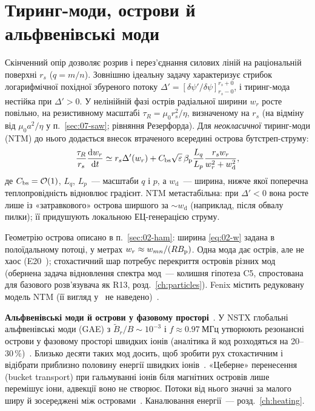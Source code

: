 \section{Тиринг-моди, острови й альфвенівські моди}\label{sec:07-tearing}

\begin{outofcorpus}
Скінченний опір дозволяє розрив і перез'єднання силових ліній на раціональній поверхні $r_s$ ($q=m/n$). Зовнішню ідеальну задачу характеризує стрибок логарифмічної похідної збуреного потоку $\Delta'=[\delta\psi'/\delta\psi]_{r_s-0}^{r_s+0}$, і тиринг-мода нестійка при $\Delta'>0$. У нелінійній фазі острів радіальної ширини $w_r$ росте повільно, на резистивному масштабі $\tau_R=\mu_0r_s^2/\eta$, визначеному на $r_s$ (на відміну від $\mu_0a^2/\eta$ у п.~\ref{sec:07-saw}; рівняння Резерфорда). Для \emph{неокласичної} тиринг-моди (NTM) до нього додається внесок втраченого всередині острова бутстреп-струму:
\begin{equation}\label{eq:07-MRE}
\frac{\tau_R}{r_s}\frac{\mathrm{d} w_r}{\mathrm{d} t}\simeq r_s\Delta'(w_r)+C_{\mathrm{bs}}\sqrt\varepsilon\,\beta_{\mathrm{p}}\frac{L_q}{L_p}\frac{r_sw_r}{w_r^2+w_{\mathrm d}^2},
\end{equation}
де $C_{\mathrm{bs}}=\mathcal{O}\!\left(1\right)$, $L_q$, $L_p$~--- масштаби $q$ і $p$, а $w_{\mathrm d}$~--- ширина, нижче якої поперечна теплопровідність відновлює градієнт. NTM метастабільна: при $\Delta'<0$ вона росте лише із «затравкового» острова ширшого за $\sim w_{\mathrm d}$ (наприклад, після обвалу пилки); її придушують локальною ЕЦ-генерацією струму.
\end{outofcorpus}

Геометрію острова описано в п.~\ref{sec:02-ham}: ширина \eqref{eq:02-w} задана в полоїдальному потоці, у метрах $w_r\approx w_{mn}/(RB_{\mathrm{p}})$. Одна мода дає острів, але не хаос (E20~\cite{ProjRegisters}); стохастичний шар потребує перекриття островів різних мод (обернена задача відновлення спектра мод~--- колишня гіпотеза C5, спростована для базового розв'язувача як R13, розд.~\ref{ch:particles}). Fenix містить редуковану модель NTM (її вигляд у~\cite{Fable2022} не наведено)~\cite[с.~4]{Fable2022}.

\textbf{Альфвенівські моди й острови у фазовому просторі}~\cite{Tyshchenko2021}. У NSTX глобальні альфвенівські моди (GAE) з $\tilde B_r/B\sim10^{-3}$ і $f\approx\SI{0.97}{МГц}$ утворюють резонансні острови у фазовому просторі швидких іонів (аналітика й код розходяться на 20--30\,\%)~\cite[с.~81]{Tyshchenko2021}. Близько десяти таких мод досить, щоб зробити рух стохастичним і відібрати приблизно половину енергії швидких іонів~\cite[с.~119]{Tyshchenko2021}. «Цеберне» перенесення (bucket transport) при гальмуванні іонів біля магнітних островів лише перемішує іони, адвекції воно не створює. Потоки від нього значні за малого ширу й зосереджені між островами~\cite[с.~5, 118]{Tyshchenko2021}. Каналювання енергії~--- розд.~\ref{ch:heating}.

